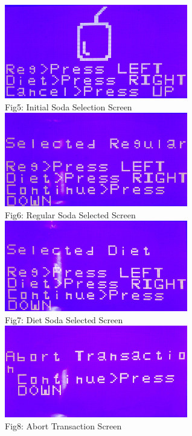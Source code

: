\documentclass{article}
\begin{document}
\begin{center}
   \includegraphics[width=8cm]{sodaselection}
   \\Fig5: Initial Soda Selection Screen
   \\[2\baselineskip]
   \includegraphics[width=8cm]{numbersoda}
   \\Fig6: Regular Soda Selected Screen
   \\[2\baselineskip]
   \includegraphics[width=8cm]{numbersoda2}
   \\Fig7: Diet Soda Selected Screen
   \\[2\baselineskip]
   \includegraphics[width=8cm]{abort}
   \\Fig8: Abort Transaction Screen
   \\[2\baselineskip]
 \end{center}
\end{document}
